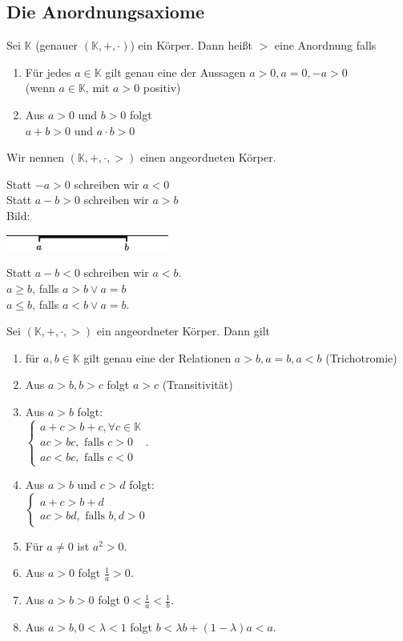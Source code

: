 \documentclass[../ana1.tex]{subfiles}
\begin{document}
\subsection{Die Anordnungsaxiome}
\begin{defi} %
	Sei $\mathbb{K}$ (genauer $(\mathbb{K},+,\cdot)$) ein Körper. Dann heißt $>$ eine Anordnung falls
	\begin{enumerate}
		\item Für jedes $a\in\mathbb{K}$ gilt genau eine der Aussagen $a>0,a=0,-a>0$\\
		      (wenn $a\in\mathbb{K}$, mit $a>0$ positiv)
		\item Aus $a>0$ und $b>0$ folgt\\
		      $a+b>0$ und $a\cdot b>0$
	\end{enumerate}
	Wir nennen $(\mathbb{K},+,\cdot,>)$ einen angeordneten Körper.
\end{defi}
\begin{bem}
	Statt $-a>0$ schreiben wir $a<0$\\
	Statt $a-b>0$ schreiben wir $a>b$\\
	Bild:
	\begin{center}
		\includegraphics[width=0.4\textwidth]{images/img02.png}
	\end{center}
	Statt $a-b<0$ schreiben wir $a<b$.\\
	$a \geq b$, falls $a>b \vee a=b$\\
	$a \leq b$, falls $a<b \vee a=b$.
\end{bem}
\begin{satz}
	Sei $(\mathbb{K}, +,\cdot, >)$ ein angeordneter Körper. Dann gilt
	\begin{enumerate}
		\item für $a,b\in\mathbb{K}$ gilt genau eine der Relationen $a>b, a=b, a<b$ (Trichotromie)
		\item Aus $a>b, b>c$ folgt $a>c$ (Transitivität)
		\item Aus $a>b$ folgt:\\
		      $\begin{cases}
				      a+c>b+c, \forall c\in\mathbb{K} \\
				      ac>bc, \text{ falls } c>0       \\
				      ac<bc, \text{ falls } c<0
			      \end{cases}$.
		\item Aus $a>b$ und $c>d$ folgt:\\
		      $\begin{cases}
				      a+c>b+d \\
				      ac>bd, \text{ falls } b,d>0 %
			      \end{cases}$
		\item Für $a\neq 0$ ist $a^2 >0$.
		\item Aus $a>0$ folgt $\frac{1}{a}>0$.
		\item Aus $a>b>0$ folgt $0<\frac{1}{a}<\frac{1}{b}$.
		\item Aus $a>b, 0<\lambda<1$ folgt $b<\lambda b + (1-\lambda)a<a$.
	\end{enumerate}
\end{satz}
\end{document}
